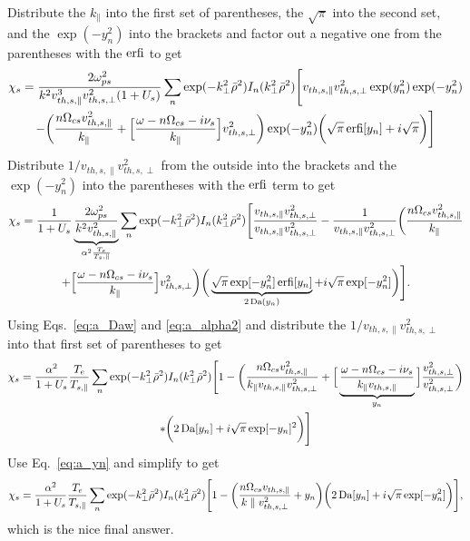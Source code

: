 Distribute the $k_\parallel$ into the first set of parentheses, the $\sqrt{\pi}$ into the second set, and
the $\exp(-y_n^2)$ into the brackets and factor out a negative one from the parentheses with the $\operatorname{erfi}$ to get
\begin{multline}
	\chi_s = \frac{2\omega_{ps}^2}{k^2 v_{th,s,\parallel}^3v_{th,s,\perp}^2(1+U_s)} \sum_n
	\exp(-k_\perp^2 \bar{\rho}^2) I_n(k_\perp^2 \bar{\rho}^2)
	\Bigg[ v_{th,s,\parallel}v_{th,s,\perp}^2 \exp(y_n^2) \exp(-y_n^2) \\
	- \bigg( \frac{n \Omega_{cs} v_{th,s,\parallel}^2}{k_\parallel} + \Big[ \frac{\omega-n\Omega_{cs}-i\nu_s}{k_\parallel} \Big]v_{th,s,\perp}^2  \bigg)
	\exp(-y_n^2)
	\bigg( \sqrt{\pi} \operatorname{erfi}[y_n] + i \sqrt{\pi}  \bigg)
	\Bigg]
\end{multline}
Distribute $1/v_{th,s,\parallel}v_{th,s,\perp}^2$ from the outside into the brackets and the $\exp(-y_n^2)$
into the parentheses with the $\operatorname{erfi}$ term to get
\begin{multline}
	\chi_s = \frac{1}{1+U_s}\underbrace{\frac{2\omega_{ps}^2}{k^2 v_{th,s,\parallel}^2}}_{\alpha^2 \frac{T_e}{T_s,\parallel}} \sum_n
	\exp(-k_\perp^2 \bar{\rho}^2) I_n(k_\perp^2 \bar{\rho}^2)
	\Bigg[\frac{v_{th,s,\parallel}v_{th,s,\perp}^2}{v_{th,s,\parallel}v_{th,s,\perp}^2} 
	- \frac{1}{v_{th,s,\parallel}v_{th,s,\perp}^2}
	\bigg( \frac{n\Omega_{cs}v_{th,s,\parallel}^2}{k_\parallel} \\+ 
	\Big[ \frac{\omega - n\Omega_{cs} - i \nu_s}{k_\parallel} \Big] v_{th,s,\perp}^2  \bigg)
	\bigg( \underbrace{\sqrt{\pi} \exp[-y_n^2] \operatorname{erfi}[y_n]}_{2\operatorname{Da}(y_n)} + i\sqrt{\pi} \exp[-y_n^2] \bigg)
	\Bigg].
\end{multline}
Using Eqs.~\ref{eq:a_Daw} and \ref{eq:a_alpha2} and distribute the $1/v_{th,s,\parallel}v_{th,s,\perp}^2$ into that first set of parentheses to get
\begin{multline}
	\chi_s = \frac{\alpha^2}{1+U_s} \frac{T_e}{T_{s,\parallel}} \sum_n
	\exp(-k_\perp^2 \bar{\rho}^2) I_n(k_\perp^2 \bar{\rho}^2)
	\Bigg[ 1 - 
	\bigg( \frac{n \Omega_{cs} v_{th,s,\parallel}^2}{k_\parallel v_{th,s,\parallel} v_{th,s,\perp}^2} + 
	\Big[ \underbrace{\frac{\omega - n\Omega_{cs} - i \nu_s}{k_\parallel v_{th,s,\parallel}}}_{y_n} \Big] \frac{v_{th,s,\perp}^2}{v_{th,s,\perp}^2} 
	\bigg) \\
	* \bigg( 2 \operatorname{Da}[y_n] + i \sqrt{\pi} \exp[-y_n]^2
	\bigg)
	\Bigg]
\end{multline}
Use Eq.~\ref{eq:a_yn} and simplify to get
\begin{equation}
	\chi_s = \frac{\alpha^2}{1+U_s} \frac{T_e}{T_{s,\parallel}} \sum_n
	\exp(-k_\perp^2 \bar{\rho}^2) I_n(k_\perp^2 \bar{\rho}^2)
	\Bigg[ 1 - \bigg( \frac{n\Omega_{cs}v_{th,s,\parallel}}{k\parallel v_{th,s,\perp}^2} + y_n \bigg)
	\bigg( 2 \operatorname{Da}[y_n] + i \sqrt{\pi} \exp[-y_n^2] \bigg)
	\Bigg],
\end{equation}
which is the nice final answer.


